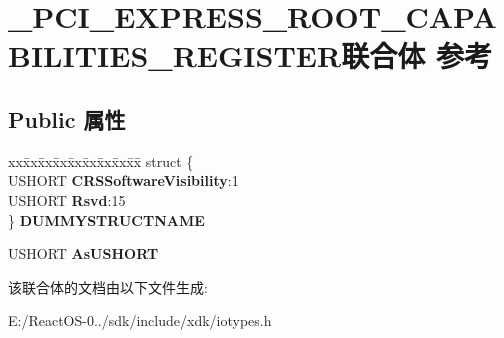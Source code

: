 \hypertarget{union___p_c_i___e_x_p_r_e_s_s___r_o_o_t___c_a_p_a_b_i_l_i_t_i_e_s___r_e_g_i_s_t_e_r}{}\section{\+\_\+\+P\+C\+I\+\_\+\+E\+X\+P\+R\+E\+S\+S\+\_\+\+R\+O\+O\+T\+\_\+\+C\+A\+P\+A\+B\+I\+L\+I\+T\+I\+E\+S\+\_\+\+R\+E\+G\+I\+S\+T\+E\+R联合体 参考}
\label{union___p_c_i___e_x_p_r_e_s_s___r_o_o_t___c_a_p_a_b_i_l_i_t_i_e_s___r_e_g_i_s_t_e_r}
\subsection*{Public 属性}
\begin{DoxyCompactItemize}
\item 
\mbox{\label{union___p_c_i___e_x_p_r_e_s_s___r_o_o_t___c_a_p_a_b_i_l_i_t_i_e_s___r_e_g_i_s_t_e_r_a0a8b0f76a4db9098399f3b70d948ebc7}} 
\begin{tabbing}
xx\=xx\=xx\=xx\=xx\=xx\=xx\=xx\=xx\=\kill
struct \{\\
\>USHORT {\bfseries CRSSoftwareVisibility}:1\\
\>USHORT {\bfseries Rsvd}:15\\
\} {\bfseries DUMMYSTRUCTNAME}\\

\end{tabbing}\item 
\mbox{\label{union___p_c_i___e_x_p_r_e_s_s___r_o_o_t___c_a_p_a_b_i_l_i_t_i_e_s___r_e_g_i_s_t_e_r_a3a035cf442a17aed97d82d156f7b0df6}} 
U\+S\+H\+O\+RT {\bfseries As\+U\+S\+H\+O\+RT}
\end{DoxyCompactItemize}


该联合体的文档由以下文件生成\+:\begin{DoxyCompactItemize}
\item 
E\+:/\+React\+O\+S-\/0../sdk/include/xdk/iotypes.\+h\end{DoxyCompactItemize}
